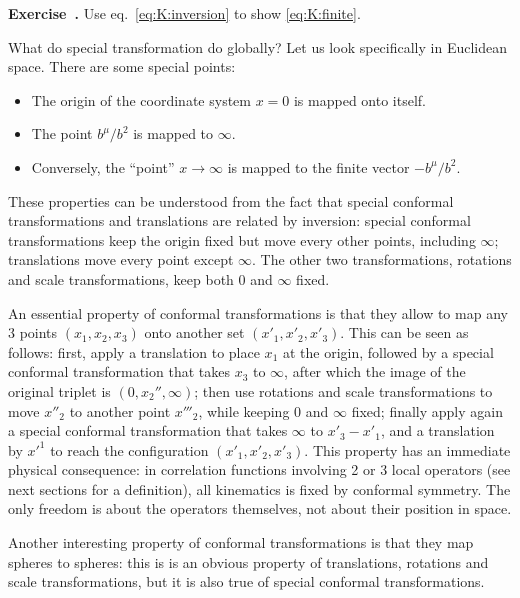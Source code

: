 \documentclass[a4paper,12pt]{article}
\numberwithin{equation}{section}
\newcounter{exercise}[section]
\newenvironment{exercise}[1][]%
	{\refstepcounter{exercise}\bigskip
	\begin{mdframed}[backgroundcolor=gray!20, linewidth=0]
	\noindent\textbf{Exercise~\thesection.\theexercise #1} \rmfamily}
  	{\end{mdframed}\bigskip}
\begin{document}
\begin{exercise}
	Use eq.~\eqref{eq:K:inversion} to show \eqref{eq:K:finite}.
\end{exercise}

What do special transformation do globally?
Let us look specifically in Euclidean space. There are some special points:
\begin{itemize}

\item
The origin of the coordinate system $x = 0$ is mapped onto itself.

\item
The point $b^\mu / b^2$ is mapped to $\infty$. 

\item
Conversely, the ``point'' $x \to \infty$ is mapped to the finite vector $-b^\mu/b^2$.

\end{itemize}
%
These properties can be understood from the fact that special conformal transformations and translations are related by inversion:
special conformal transformations keep the origin fixed but move every other points, including $\infty$; translations move every point except $\infty$. The other two transformations, rotations and scale transformations, keep both $0$ and $\infty$ fixed.


An essential property of conformal transformations is that they allow to map any 3 points $(x_1, x_2, x_3)$ onto another set $( x'_1, x'_2, x'_3)$. This can be seen as follows: first, apply a translation to place $x_1$ at the origin, followed by a special conformal transformation that takes $x_3$ to $\infty$, after which the image of the original triplet is $(0, x_2'', \infty)$; then use rotations and scale transformations to move $x''_2$ to another point $x'''_2$, while keeping $0$ and $\infty$ fixed; finally apply again a special conformal transformation that takes $\infty$ to $x'_3 - x'_1$, and a translation by $x'^1$ to reach the configuration $( x'_1, x'_2, x'_3)$.
This property has an immediate physical consequence: in correlation functions involving 2 or 3 local operators (see next sections for a definition), all kinematics is fixed by conformal symmetry. The only freedom is about the operators themselves, not about their position in space.

Another interesting property of conformal transformations is that they map spheres to spheres: this is is an obvious property of translations, rotations and scale transformations, but it is also true of special conformal transformations. 
\end{document}
